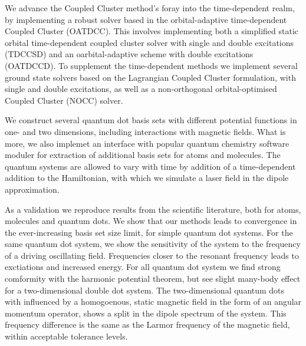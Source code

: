 We advance the Coupled Cluster method's foray into the time-dependent realm, 
by implementing a robust solver based in the orbital-adaptive time-dependent 
Coupled Cluster (OATDCC)\cite{kvaal2012ab}.
This involves implementing both a simplified static
orbital time-dependent coupled cluster solver with single and double excitations 
(TDCCSD) and an oarbital-adaptive scheme with double excitations (OATDCCD).
To supplement the time-dependent methods we implement several ground state 
solvers based on the Lagrangian Coupled Cluster formulation, with single and double 
excitations, as well as a non-orthogonal orbital-optimised Coupled Cluster (NOCC)
solver\cite{myhre2018demonstrating}.

We construct several quantum dot basis sets with different potential functions
in one- and two dimensions, including interactions with magnetic fields.
What is more, we also implemet an 
interface with popular quantum chemistry software moduler for extraction of additional 
basis sets for atoms and molecules. The quantum systems are allowed to vary with time 
by addition of a time-dependent addition to the Hamiltonian, with which we simulate 
a laser field in the dipole approximation.

As a validation we reproduce results from the scientific literature, both for 
atoms, molecules and quantum dots. We show that our methods leads to convergence in 
the ever-increasing basis set size limit, for simple quantum dot systems. For the 
same quantum dot system, we show the sensitivity of the system to the frequency of 
a driving oscillating field. Frequencies closer to the resonant frequency 
leads to exctiations and increased energy. For all quantum dot system we find 
strong comformity with the harmonic potential theorem, but see slight many-body 
effect for a two-dimensional double dot system. The two-dimensional quantum dots 
with influenced by a homogoenous, static magnetic field in the form of an angular 
momentum operator, shows a split in the dipole spectrum of the system. This
frequency difference is the same as the Larmor frequency of the magnetic field,
within acceptable tolerance levels. 